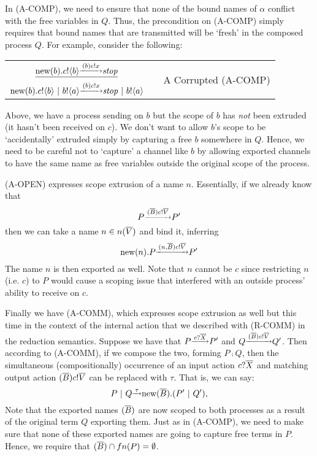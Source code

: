In (A-COMP), we need to ensure that none of the bound names of $\alpha$ conflict with the free variables in $Q$.  
Thus, the precondition on (A-COMP) simply requires that bound names that are transmitted will be `fresh' in the composed process $Q$.  
For example, consider the following:
\begin{center}\begin{tabular}{rllll}
	\multicolumn{3}{c}{$\underline{\text{new}({b}).{c}!\langle{b}\rangle\overset{\underrightarrow{\ { \ensuremath{({b})}  \ensuremath{{c}!{x}} }\ }}{} \mbox{\emph{stop}}}$} & & \multirow{2}{*}{\tiny{A Corrupted (A-COMP)}}\\
	\multicolumn{3}{c}{$\text{new}({b}).{c}!\langle{b}\rangle \ |\  {b}!\langle{a}\rangle\overset{\underrightarrow{\ { \ensuremath{({b})}  \ensuremath{{c}!{x}} }\ }}{} \mbox{\emph{stop}}\ |\  {b}!\langle{a}\rangle$}\\[10pt]
\end{tabular}\end{center}
Above, we have a process sending on $b$ but the scope of $b$ has \emph{not} been extruded (it hasn't been received on $c$).
We don't want to allow $b$'s scope to be `accidentally' extruded simply by capturing a free $b$ somewhere in $Q$.
Hence, we need to be careful not to `capture' a channel like $b$ by allowing exported channels to have the same name as free variables outside the original scope of the process.

(A-OPEN) expresses scope extrusion of a name $n$.  
Essentially, if we already know that 
\[
	P\overset{\underrightarrow{\ { \ensuremath{({\overline{B}})}  \ensuremath{{c}!{\overline{V}}} }\ }}{} P'
\]
then we can take a name $n\in n(\overline{V})$ and bind it, inferring
\[
	\text{new}({n}). P\overset{\underrightarrow{\ { \ensuremath{({n,\overline{B}})}  \ensuremath{{c}!{\overline{V}}} }\ }}{} P'
\]
The name $n$ is then exported as well.
Note that $n$ cannot be $c$ since restricting $n$ (i.e. $c$) to $P$ would cause a scoping issue that interfered with an outside process' ability to receive on $c$.

Finally we have (A-COMM), which expresses scope extrusion as well but this time in the context of the internal action that we described with (R-COMM) in the reduction semantics.  
Suppose we have that $P \overset{\underrightarrow{\ { \ensuremath{{c}?{\overline{X}}} }\ }}{} P'$ and $Q \overset{\underrightarrow{\ { \ensuremath{({\overline{B}})}  \ensuremath{{c}!{\overline{V}}} }\ }}{} Q'$.
Then according to (A-COMM), if we compose the two, forming $P\comp Q$, then the simultaneous (compositionally) occurrence of an input action ${c}?{\overline{X}}$ and matching output action $({\overline{B}}){c}!{\overline{V}}$ can be replaced with $\tau$.
That is, we can say:
\[
	P\ |\  Q \overset{\underrightarrow{\ {\tau}\ }}{} \text{new}({\overline{B}}).(P'\ |\  Q'),
\]
Note that the exported names $({\overline{B}})$ are now scoped to both processes as a result of the original term $Q$ exporting them.  
Just as in (A-COMP), we need to make sure that none of these exported names are going to capture free terms in $P$.  
Hence, we require that $({\overline{B}})\cap fn(P) = \emptyset$.

